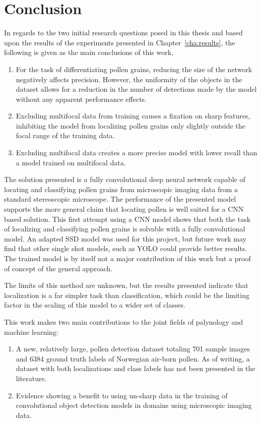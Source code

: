 \chapter{Conclusion}\label{cha:conclusion}
In regards to the two initial research questions posed in this thesis and based upon the results of the experiments presented in Chapter~\ref{cha:results}, the following is given as the main conclusions of this work,

\begin{enumerate}
    \item For the task of differentiating pollen grains, reducing the size of the network negatively affects precision. However, the uniformity of the objects in the dataset allows for a reduction in the number of detections made by the model without any apparent performance effects.
    \item Excluding multifocal data from training causes a fixation on sharp features, inhibiting the model from localizing pollen grains only slightly outside the focal range of the training data.
    \item Excluding multifocal data creates a more precise model with lower recall than a model trained on multifocal data.
\end{enumerate}

The solution presented is a fully convolutional deep neural network capable of locating and classifying pollen grains from microscopic imaging data from a standard stereoscopic microscope.
The performance of the presented model supports the more general claim that locating pollen is well suited for a CNN based solution.
This first attempt using a CNN model shows that both the task of localizing and classifying pollen grains is solvable with a fully convolutional model.
An adapted SSD model was used for this project, but future work may find that other single shot models, such as YOLO could provide better results.
The trained model is by itself not a major contribution of this work but a proof of concept of the general approach.

The limits of this method are unknown, but the results presented indicate that localization is a far simpler task than classification, which could be the limiting factor in the scaling of this model to a wider set of classes.

This work makes two main contributions to the joint fields of palynology and machine learning:

\begin{enumerate}
    \item A new, relatively large, pollen detection dataset totaling 701 sample images and 6384 ground truth labels of Norwegian air-born pollen. As of writing, a dataset with both localizations and class labels has not been presented in the literature.
    \item Evidence showing a benefit to using un-sharp data in the training of convolutional object detection models in domains using microscopic imaging data.
\end{enumerate}


